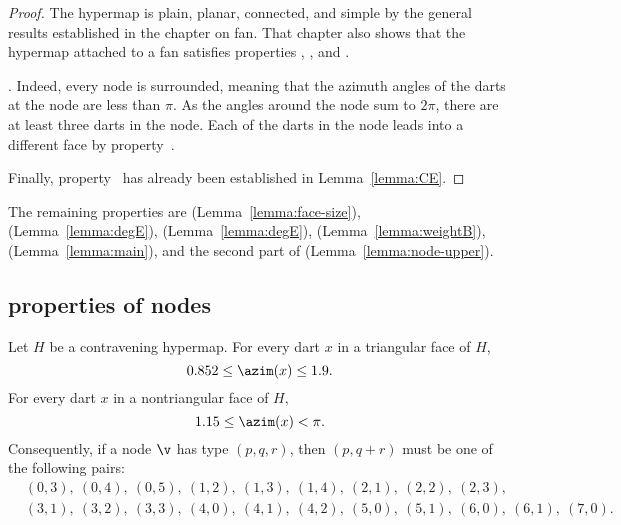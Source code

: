 \begin{proof}
  The hypermap is plain, planar, connected, and simple by the general
  results established in the chapter on fan.  That chapter also shows
  that the hypermap attached to a fan satisfies properties
  , , and .

  .  Indeed, every node is
  surrounded, meaning that the azimuth angles of the darts at the
  node are less than $\pi$.  As the angles around the node sum to
  $2\pi$, there are at least three darts in the node. Each of the
  darts in the node leads into a different face by
  property~.

  Finally, property~ has already been established in
  Lemma~\ref{lemma:CE}.
\end{proof}

The remaining properties are 
(Lemma~\ref{lemma:face-size}), %
 (Lemma~\ref{lemma:degE}), 
(Lemma~\ref{lemma:degE}), 
(Lemma~\ref{lemma:weightB}), 
(Lemma~\ref{lemma:main}), and the second part of 
(Lemma~\ref{lemma:node-upper}).


\subsection{properties of nodes}
%



\begin{lemma}[] \label{lemma:0.852}
Let $H$ be a contravening
hypermap. For every dart $x$ in a triangular face of $H$,
\[ 0.852\le \azim(x)\le 1.9.\] 
For every dart $x$ in a nontriangular face of $H$, 
\[ 1.15\le\azim(x)<\pi.\] 
%
%
Consequently, if a node $\v$ has type $(p,q,r)$, then $(p,q+r)$ must
be one of the following pairs:
\begin{align*}
  &(0,3),~(0,4),~(0,5),~(1,2),~(1,3),~(1,4),~(2,1),~(2,2),~(2,3),\\
  &(3,1),~(3,2),~(3,3),~(4,0),~(4,1),~(4,2),
  ~(5,0),~(5,1),~(6,0),~(6,1),~(7,0).
\end{align*}
\end{lemma}
%

